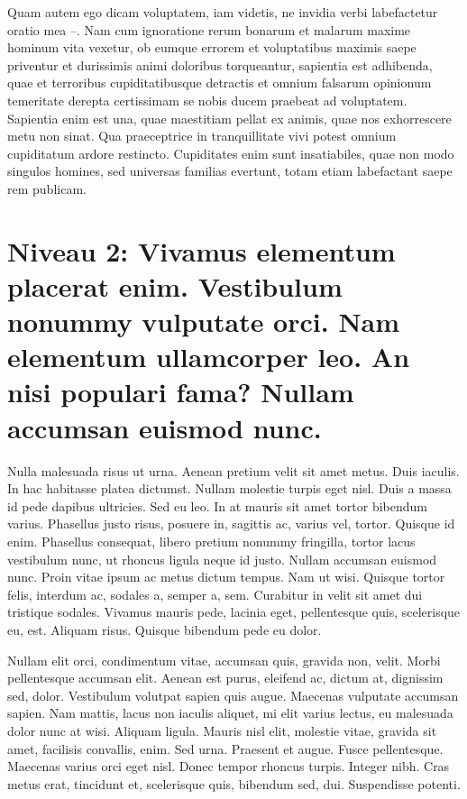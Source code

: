 \documentclass[twoside]{extreport}
\begin{document}
Quam autem ego dicam voluptatem, iam videtis, ne invidia verbi
labefactetur oratio mea --. Nam cum ignoratione rerum bonarum et malarum
maxime hominum vita vexetur, ob eumque errorem et voluptatibus maximis
saepe priventur et durissimis animi doloribus torqueantur, sapientia est
adhibenda, quae et terroribus cupiditatibusque detractis et omnium
falsarum opinionum temeritate derepta certissimam se nobis ducem
praebeat ad voluptatem. Sapientia enim est una, quae maestitiam pellat
ex animis, quae nos exhorrescere metu non sinat. Qua praeceptrice in
tranquillitate vivi potest omnium cupiditatum ardore restincto.
Cupiditates enim sunt insatiabiles, quae non modo singulos homines, sed
universas familias evertunt, totam etiam labefactant saepe rem publicam.

\hypertarget{niveau-2-vivamus-elementum-placerat-enim.-vestibulum-nonummy-vulputate-orci.-nam-elementum-ullamcorper-leo.-an-nisi-populari-fama-nullam-accumsan-euismod-nunc.}{%
\section*{Niveau 2: Vivamus elementum placerat enim. Vestibulum nonummy
vulputate orci. Nam elementum ullamcorper leo. An nisi populari fama?
Nullam accumsan euismod
nunc.}\label{niveau-2-vivamus-elementum-placerat-enim.-vestibulum-nonummy-vulputate-orci.-nam-elementum-ullamcorper-leo.-an-nisi-populari-fama-nullam-accumsan-euismod-nunc.}}

Nulla malesuada risus ut urna. Aenean pretium velit sit amet metus. Duis
iaculis. In hac habitasse platea dictumst. Nullam molestie turpis eget
nisl. Duis a massa id pede dapibus ultricies. Sed eu leo. In at mauris
sit amet tortor bibendum varius. Phasellus justo risus, posuere in,
sagittis ac, varius vel, tortor. Quisque id enim. Phasellus consequat,
libero pretium nonummy fringilla, tortor lacus vestibulum nunc, ut
rhoncus ligula neque id justo. Nullam accumsan euismod nunc. Proin vitae
ipsum ac metus dictum tempus. Nam ut wisi. Quisque tortor felis,
interdum ac, sodales a, semper a, sem. Curabitur in velit sit amet dui
tristique sodales. Vivamus mauris pede, lacinia eget, pellentesque quis,
scelerisque eu, est. Aliquam risus. Quisque bibendum pede eu dolor.

Nullam elit orci, condimentum vitae, accumsan quis, gravida non, velit.
Morbi pellentesque accumsan elit. Aenean est purus, eleifend ac, dictum
at, dignissim sed, dolor. Vestibulum volutpat sapien quis augue.
Maecenas vulputate accumsan sapien. Nam mattis, lacus non iaculis
aliquet, mi elit varius lectus, eu malesuada dolor nunc at wisi. Aliquam
ligula. Mauris nisl elit, molestie vitae, gravida sit amet, facilisis
convallis, enim. Sed urna. Praesent et augue. Fusce pellentesque.
Maecenas varius orci eget nisl. Donec tempor rhoncus turpis. Integer
nibh. Cras metus erat, tincidunt et, scelerisque quis, bibendum sed,
dui. Suspendisse potenti.
\end{document}
